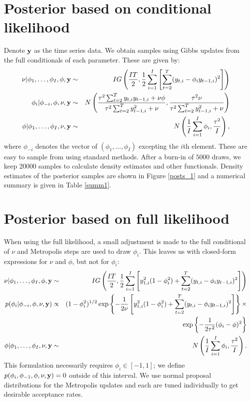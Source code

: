 \documentclass[12pt]{article}
\begin{document}
\section{Posterior based on conditional likelihood}

\noindent Denote $\mathbf{\bm{y}}$ as the time series data. We obtain samples using Gibbs updates from the full conditionals of each parameter. These are given by:
\begin{eqnarray*}
\nu|\phi_1,\ldots,\phi_I,\phi,\mathbf{\bm{y}} &\sim& IG\left(\frac{IT}{2}, \frac{1}{2}\sum_{i=1}^I\left[\sum_{t=2}^T(y_{t,i}-\phi_iy_{t-1,i})^2\right]\right) \\
\phi_i|\phi_{-i},\phi,\nu,\mathbf{\bm{y}} &\sim& N\left(\frac{\tau^2\sum_{t=2}^Ty_{t,i}y_{t-1,i} + \nu\phi}{\tau^2\sum_{t=2}^Ty_{t-1,i}^2 + \nu},\frac{\tau^2\nu}{\tau^2\sum_{t=2}^Ty_{t-1,i}^2 + \nu}\right) \\
\phi|\phi_1,\ldots,\phi_I,\nu,\mathbf{\bm{y}} &\sim& N\left(\frac{1}{I}\sum_{i=1}^I\phi_i, \frac{\tau^2}{I}\right),
\end{eqnarray*}
\noindent where $\phi_{-i}$ denotes the vector of $(\phi_1,\ldots,\phi_I)$ excepting the $i$th element. These are easy to sample from using standard methods. After a burn-in of $5000$ draws, we keep $20000$ samples to calculate density estimates and other functionals. Density estimates of the posterior samples are shown in Figure \ref{posts_1} and a numerical summary is given in Table \ref{summ1}.

\section{Posterior based on full likelihood}

\noindent When using the full likelihood, a small adjustment is made to the full conditional of $\nu$ and Metropolis steps are used to draw $\phi_i$. This leaves us with closed-form expressions for $\nu$ and $\phi$, but not for $\phi_i$:
\begin{eqnarray*}
\nu|\phi_1,\ldots,\phi_I,\phi,\mathbf{\bm{y}} &\sim& IG\left(\frac{IT}{2}, \frac{1}{2}\sum_{i=1}^I\left[y_{1,i}^2(1-\phi_i^2)+\sum_{t=2}^T(y_{t,i}-\phi_iy_{t-1,i})^2\right]\right) \\
p(\phi_i|\phi_{-i},\phi,\nu,\mathbf{\bm{y}}) &\propto& (1-\phi_i^2)^{1/2}\exp\left\{-\frac{1}{2\nu}\left[y_{1,i}^2(1-\phi_i^2)+\sum_{t=2}^T(y_{t,i}-\phi_iy_{t-1,i})^2\right]\right\}\times \\
& & ~~~~ ~~~~ \exp\left\{-\frac{1}{2\tau^2}(\phi_i-\phi)^2\right\} \\
\phi|\phi_1,\ldots,\phi_I,\nu,\mathbf{\bm{y}} &\sim& N\left(\frac{1}{I}\sum_{i=1}^I\phi_i, \frac{\tau^2}{I}\right).
\end{eqnarray*}
\noindent This formulation necessarily requires $\phi_i\in[-1,1]$; we define $p(\phi_i,\phi_{-1},\phi,\nu,\mathbf{\bm{y}})=0$ outside of this interval. We use normal proposal distributions for the Metropolis updates and each are tuned individually to get desirable acceptance rates.
\bigskip
\end{document}

